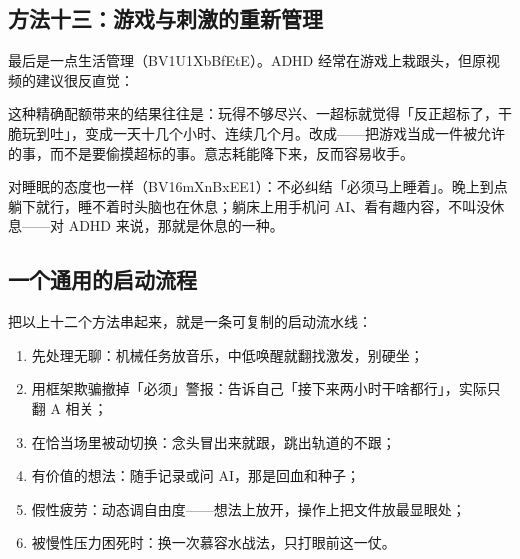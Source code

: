 \subsection{方法十三：游戏与刺激的重新管理}

最后是一点生活管理（BV1U1XbBfEtE）。ADHD 经常在游戏上栽跟头，但原视频的建议很反直觉：

这种精确配额带来的结果往往是：玩得不够尽兴、一超标就觉得「反正超标了，干脆玩到吐」，变成一天十几个小时、连续几个月。改成——把游戏当成一件被允许的事，而不是要偷摸超标的事。意志耗能降下来，反而容易收手。

对睡眠的态度也一样（BV16mXnBxEE1）：不必纠结「必须马上睡着」。晚上到点躺下就行，睡不着时头脑也在休息；躺床上用手机问 AI、看有趣内容，不叫没休息——对 ADHD 来说，那就是休息的一种。

\subsection{一个通用的启动流程}

把以上十二个方法串起来，就是一条可复制的启动流水线：

\begin{enumerate}[leftmargin=2em,itemsep=2pt]
  \item 先处理无聊：机械任务放音乐，中低唤醒就翻找激发，别硬坐；
  \item 用框架欺骗撤掉「必须」警报：告诉自己「接下来两小时干啥都行」，实际只翻 A 相关；
  \item 在恰当场里被动切换：念头冒出来就跟，跳出轨道的不跟；
  \item 有价值的想法：随手记录或问 AI，那是回血和种子；
  \item 假性疲劳：动态调自由度——想法上放开，操作上把文件放最显眼处；
  \item 被慢性压力困死时：换一次慕容水战法，只打眼前这一仗。
\end{enumerate}

